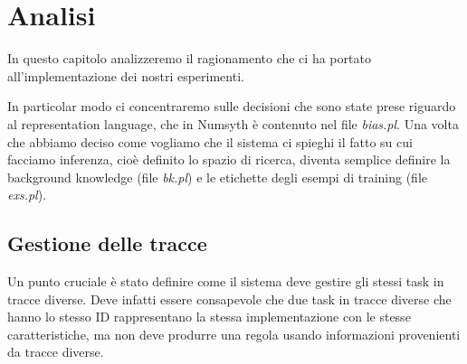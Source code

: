 \chapter{Analisi}
\label{cap:analisi}
In questo capitolo analizzeremo il ragionamento che ci ha portato all'implementazione dei nostri esperimenti.

In particolar modo ci concentraremo sulle decisioni che sono state prese riguardo al representation language, che in Numsyth è contenuto nel file \textit{bias.pl}. Una volta che abbiamo deciso come vogliamo che il sistema ci spieghi il fatto su cui facciamo inferenza, cioè definito lo spazio di ricerca, diventa semplice definire la background knowledge (file \textit{bk.pl}) e le etichette degli esempi di training (file \textit{exs.pl}).

\section{Gestione delle tracce}
Un punto cruciale è stato definire come il sistema deve gestire gli stessi task in tracce diverse. Deve infatti essere consapevole che due task in tracce diverse che hanno lo stesso ID rappresentano la stessa implementazione con le stesse caratteristiche, ma non deve produrre una regola usando informazioni provenienti da tracce diverse.

